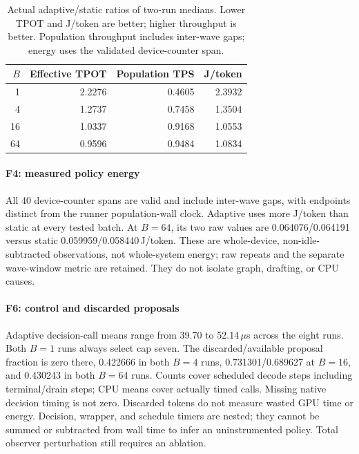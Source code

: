 \documentclass[conference,letterpaper]{IEEEtran}
\begin{document}
\begin{table}[t]
\centering\small
\caption{Actual adaptive/static ratios of two-run medians. Lower TPOT and J/token are better; higher throughput is better. Population throughput includes inter-wave gaps; energy uses the validated device-counter span.}
\label{tab:policytradeoff}
\begin{tabular}{@{}rrrr@{}}
\toprule
$B$ & Effective TPOT & Population TPS & J/token \\\midrule
1 & 2.2276 & 0.4605 & 2.3932 \\
4 & 1.2737 & 0.7458 & 1.3504 \\
16 & 1.0337 & 0.9168 & 1.0553 \\
64 & 0.9596 & 0.9484 & 1.0834 \\
\bottomrule
\end{tabular}
\end{table}

\paragraph{F4: measured policy energy} All 40 device-counter spans are valid and include inter-wave gaps, with endpoints distinct from the runner population-wall clock. Adaptive uses more J/token than static at every tested batch. At $B=64$, its two raw values are 0.064076/0.064191 versus static 0.059959/0.058440\,J/token. These are whole-device, non-idle-subtracted observations, not whole-system energy; raw repeats and the separate wave-window metric are retained. They do not isolate graph, drafting, or CPU causes.

\paragraph{F6: control and discarded proposals} Adaptive decision-call means range from 39.70 to 52.14\,$\mu$s across the eight runs. Both $B=1$ runs always select cap seven. The discarded/available proposal fraction is zero there, 0.422666 in both $B=4$ runs, 0.731301/0.689627 at $B=16$, and 0.430243 in both $B=64$ runs. Counts cover scheduled decode steps including terminal/drain steps; CPU means cover actually timed calls. Missing native decision timing is not zero. Discarded tokens do not measure wasted GPU time or energy. Decision, wrapper, and schedule timers are nested; they cannot be summed or subtracted from wall time to infer an uninstrumented policy. Total observer perturbation still requires an ablation.
\end{document}
